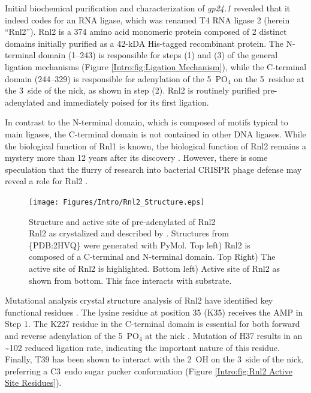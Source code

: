     Initial biochemical purification and characterization of \textit{gp24.1} \citep{Ho2002b} revealed that it indeed codes for an RNA ligase, which was renamed T4 RNA ligase 2 (herein ``Rnl2''). Rnl2 is a 374 amino acid monomeric protein composed of 2 distinct domains initially purified as a 42-kDA His-tagged recombinant protein. The N-terminal domain (1--243) is responsible for steps (1) and (3) of the general ligation mechanisms (Figure \ref{Intro:fig:Ligation Mechanism}), while the C-terminal domain (244--329) is responsible for adenylation of the 5\textprime~PO$_{4}$ on the 5\textprime~residue at the 3\textprime~side of the nick, as shown in step (2). Rnl2 is routinely purified pre-adenylated and immediately poised for its first ligation.

    In contrast to the N-terminal domain, which is composed of motifs typical to main ligases, the C-terminal domain is not contained in other DNA ligases. While the biological function of Rnl1 is known, the biological function of Rnl2 remains a mystery more than 12 years after its discovery \citep{Chauleau2013b}. However, there is some speculation that the flurry of research into bacterial CRISPR phage defense may reveal a role for Rnl2 \citep{Barrangou2007c,Chauleau2013b}.

    \begin{figure} %
      \centering
      \texttt{[image: Figures/Intro/Rnl2\_Structure.eps]}
      \caption[Structure and active site of pre-adenylated Rnl2]
      {
        Structure and active site of pre-adenylated of Rnl2\\[0.25cm]
        Rnl2 as crystalized and described by \citep{Nandakumar2006}. Structures from \{PDB:2HVQ\} were generated with PyMol. Top left) Rnl2 is composed of a C-terminal and N-terminal domain. Top Right) The active site of Rnl2 is highlighted. Bottom left) Active site of Rnl2 as shown from bottom. This face interacts with substrate.
        }
      \label{Intro:fig:Rnl2 General Structure}
      \end{figure}

    Mutational analysis crystal structure analysis of Rnl2 have identified key functional residues \citep{Ho2004, Nandakumar2006,Nandakumar2004a,Yin2003d}. The lysine residue at position 35 (K35) receives the AMP in Step 1. The K227 residue in the C-terminal domain is essential for both forward and reverse adenylation of the 5\textprime~PO$_4$ at the nick \citep{Viollet2011}. Mutation of H37 results in an \textasciitilde102 reduced ligation rate, indicating the important nature of this residue. Finally, T39 has been shown to interact with the 2\textprime~OH on the 3\textprime~side of the nick, preferring a C3\textprime~endo sugar pucker conformation (Figure \ref{Intro:fig:Rnl2 Active Site Residues}).

